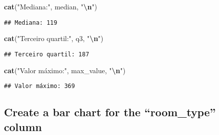 \documentclass[
]{article}
\newenvironment{Shaded}{\begin{snugshade}}{\end{snugshade}}
\newcommand{\AttributeTok}[1]{\textcolor[rgb]{0.13,0.29,0.53}{#1}}
\newcommand{\FunctionTok}[1]{\textcolor[rgb]{0.13,0.29,0.53}{\textbf{#1}}}
\newcommand{\NormalTok}[1]{#1}
\newcommand{\SpecialCharTok}[1]{\textcolor[rgb]{0.81,0.36,0.00}{\textbf{#1}}}
\newcommand{\StringTok}[1]{\textcolor[rgb]{0.31,0.60,0.02}{#1}}
\begin{document}
\begin{Shaded}
\begin{Highlighting}[]
\FunctionTok{cat}\NormalTok{(}\StringTok{"Mediana:"}\NormalTok{, median, }\StringTok{"}\SpecialCharTok{\textbackslash{}n}\StringTok{"}\NormalTok{)}
\end{Highlighting}
\end{Shaded}

\begin{verbatim}
## Mediana: 119
\end{verbatim}

\begin{Shaded}
\begin{Highlighting}[]
\FunctionTok{cat}\NormalTok{(}\StringTok{"Terceiro quartil:"}\NormalTok{, q3, }\StringTok{"}\SpecialCharTok{\textbackslash{}n}\StringTok{"}\NormalTok{)}
\end{Highlighting}
\end{Shaded}

\begin{verbatim}
## Terceiro quartil: 187
\end{verbatim}

\begin{Shaded}
\begin{Highlighting}[]
\FunctionTok{cat}\NormalTok{(}\StringTok{"Valor máximo:"}\NormalTok{, max\_value, }\StringTok{"}\SpecialCharTok{\textbackslash{}n}\StringTok{"}\NormalTok{)}
\end{Highlighting}
\end{Shaded}

\begin{verbatim}
## Valor máximo: 369
\end{verbatim}

\hypertarget{create-a-bar-chart-for-the-room_type-column}{%
\subsection{Create a bar chart for the ``room\_type''
column}\label{create-a-bar-chart-for-the-room_type-column}}

\begin{Shaded}
\end{Shaded}
\end{document}
